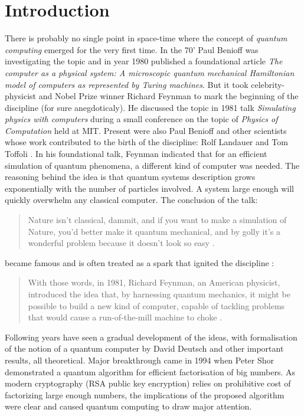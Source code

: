 \chapter{Introduction}
There is probably no single point in space-time where the concept of \textit{quantum computing} emerged for the very first time. In the 70' Paul Benioff was investigating the topic and in year 1980 published a foundational article \textit{The computer as a physical system: A microscopic quantum mechanical Hamiltonian model of computers as represented by Turing machines}\cite{benioff_computer_1980}. But it took celebrity-physicist and Nobel Prize winner Richard Feynman to mark the beginning of the discipline (for sure anegdoticaly). He discussed the topic in 1981 talk \textit{Simulating physics with computers} during a small conference on the topic of \textit{Physics of Computation} held at MIT. Present were also Paul Benioff and other scientists whose work contributed to the birth of the discipline: Rolf Landauer and Tom Toffoli \cite{mit_endicott_house_physics_2018}. In his foundational talk, Feynman indicated that for an efficient simulation of quantum phenomena, a different kind of computer was needed. The reasoning behind the idea is that quantum systems description grows exponentially with the number of particles involved. A system large enough will quickly overwhelm any classical computer. The conclusion of the talk:
\begin{quote}
Nature isn't classical, dammit, and if you want to make a simulation of Nature, you'd better make it quantum mechanical, and by golly it's a wonderful problem because it doesn't look so easy \cite{feynman_simulating_1982}.
\end{quote}
became famous and is often treated as a spark that ignited the discipline \cite{john_preskill_feynman_2017}\cite{trabesinger_quantum_2012}\cite{the_quantum_insider_global_2021}:
\begin{quote}
With those words, in 1981, Richard Feynman, an American physicist, introduced the idea that, by harnessing quantum mechanics, it might be possible to build a new kind of computer, capable of tackling problems that would cause a run-of-the-mill machine to choke \cite{the_economist_google_2019}.
\end{quote}
Following years have seen a gradual development of the ideas, with formalisation of the notion of a quantum computer by David Deutsch\cite{david_deutsch_quantum_1985} and other important results, all theoretical. Major breakthrough came in 1994 when Peter Shor demonstrated a quantum algorithm for efficient factorisation of big numbers. As modern cryptography (RSA public key encryption) relies on prohibitive cost of factorizing large enough numbers, the implications of the proposed algorithm were clear and caused quantum computing to draw major attention.

